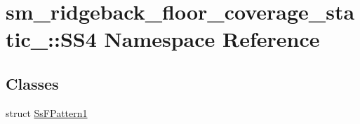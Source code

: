\hypertarget{namespacesm__ridgeback__floor__coverage__static__1_1_1SS4}{}\section{sm\+\_\+ridgeback\+\_\+floor\+\_\+coverage\+\_\+static\+\_\+:\+:S\+S4 Namespace Reference}
\label{namespacesm__ridgeback__floor__coverage__static__1_1_1SS4}
\subsection*{Classes}
\begin{DoxyCompactItemize}
\item 
struct \hyperlink{structsm__ridgeback__floor__coverage__static__1_1_1SS4_1_1SsFPattern1}{Ss\+F\+Pattern1}
\end{DoxyCompactItemize}
